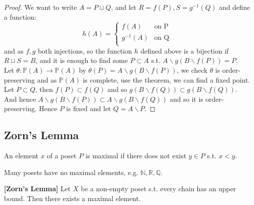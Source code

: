 \begin{proof} We want to write $A = P \sqcup Q$, and let $R = f(P), S = g^{-1}(Q)$
and define a function:
\begin{equation*}
h(A)= \left\{
\begin{array}{ll}
f(A) & \text{on P } \\
g^{-1}(A) & \text{on Q} \\
\end{array} \right.
\end{equation*}
and as $f,g$ both injections, so the function $h$ defined above is a bijection
if $R \sqcup S = B$, and it is enough to find some $P \subset A$ s.t. $A \backslash g(B \backslash f(P)) = P$.\\
Let $\theta: \mathbb{P}(A) \rightarrow \mathbb{P}(A)$ by $\theta(P) = A \backslash g(B \backslash f(P))$, we check $\theta$ is order-preserving and as $\mathbb{P}(A)$ is complete,
use the theorem, we can find a fixed point. Let $P \subset Q$, then $f(P) \subset f(Q)$
and so $g(B \backslash f(Q)) \subset g(B \backslash f(Q))$.
And hence $ A \backslash g(B \backslash f(P)) \subset A \backslash g(B \backslash f(Q))$
and so it is order-preserving. Hence $P$ is fixed and let $Q = A \backslash P$.
\end{proof}

\subsection{Zorn's Lemma}
\begin{definition} An element $x$ of a poset $P$ is maximal
if there does not exist $y \in P$ s.t. $x<y$.
\end{definition}
Many posets have no maximal elements, e.g. $\mathbb{N,R,Q}$.
\begin{theorem}{\bf [Zorn's Lemma]}\label{Z;Zorn} Let $X$ be a non-empty poset s.t.
every chain has an upper bound. Then there exists a maximal element.
\end{theorem}

